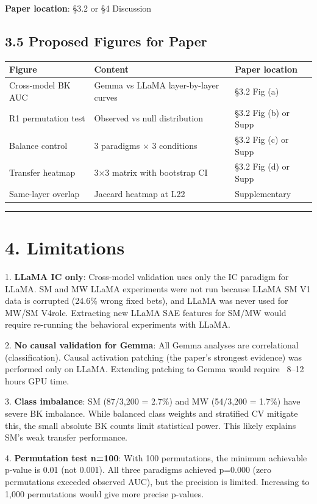 \documentclass[11pt,a4paper]{article}
\begin{document}
\textbf{Paper location}: §3.2 or §4 Discussion

\subsection{3.5 Proposed Figures for Paper}

\begin{table}[htbp]
\centering
\footnotesize
\begin{tabular}{|l|l|l|}
\hline
Figure & Content & Paper location \\
\hline
Cross-model BK AUC & Gemma vs LLaMA layer-by-layer curves & §3.2 Fig (a) \\
R1 permutation test & Observed vs null distribution & §3.2 Fig (b) or Supp \\
Balance control & 3 paradigms × 3 conditions & §3.2 Fig (c) or Supp \\
Transfer heatmap & 3×3 matrix with bootstrap CI & §3.2 Fig (d) or Supp \\
Same-layer overlap & Jaccard heatmap at L22 & Supplementary \\
\hline
\end{tabular}
\end{table}

\bigskip\hrule\bigskip

\section{4. Limitations}

1. \textbf{LLaMA IC only}: Cross-model validation uses only the IC paradigm for LLaMA. SM and MW LLaMA experiments were not run because LLaMA SM V1 data is corrupted (24.6\% wrong fixed bets), and LLaMA was never used for MW/SM V4role. Extracting new LLaMA SAE features for SM/MW would require re-running the behavioral experiments with LLaMA.

2. \textbf{No causal validation for Gemma}: All Gemma analyses are correlational (classification). Causal activation patching (the paper's strongest evidence) was performed only on LLaMA. Extending patching to Gemma would require ~8–12 hours GPU time.

3. \textbf{Class imbalance}: SM (87/3,200 = 2.7\%) and MW (54/3,200 = 1.7\%) have severe BK imbalance. While balanced class weights and stratified CV mitigate this, the small absolute BK counts limit statistical power. This likely explains SM's weak transfer performance.

4. \textbf{Permutation test n=100}: With 100 permutations, the minimum achievable p-value is 0.01 (not 0.001). All three paradigms achieved p=0.000 (zero permutations exceeded observed AUC), but the precision is limited. Increasing to 1,000 permutations would give more precise p-values.
\end{document}

